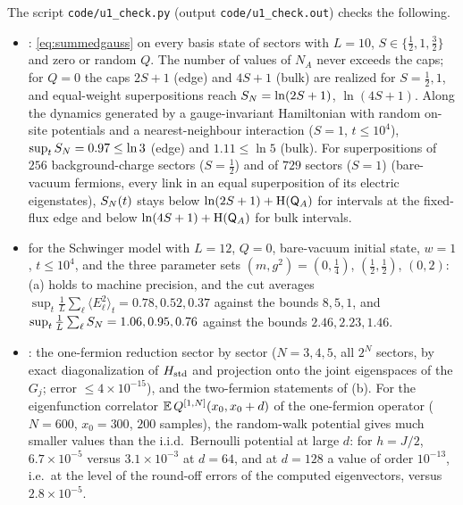 \begin{remark}\label{rem:u1numerics}
The script \texttt{code/u1\_check.py} (output \texttt{code/u1\_check.out}) checks the following.
\begin{itemize}
\item {}: \eqref{eq:summedgauss} on every basis state of sectors with $L=10$, $S\in\{\frac12,1,\frac32\}$
and zero or random $Q$.  The number of values of $N_A$ never exceeds the caps; for $Q=0$ the caps $2S+1$ (edge) and
$4S+1$ (bulk) are realized for $S=\frac12,1$, and equal-weight superpositions reach $S_{N}=\ln(2S+1)$, $\ln(4S+1)$.  Along
the dynamics generated by a gauge-invariant Hamiltonian with random on-site potentials and a nearest-neighbour
interaction ($S=1$, $t\le10^4$), $\sup_tS_{N}=0.97\le\ln3$ (edge) and $1.11\le\ln5$ (bulk).  For superpositions of
$256$ background-charge sectors ($S=\frac12$) and of $729$ sectors ($S=1$) (bare-vacuum fermions, every link in an equal
superposition of its electric eigenstates), $S_{N}(t)$ stays below $\ln(2S+1)+\mathrm{H}(\mathsf{Q}_A)$ for intervals at the
fixed-flux edge and below $\ln(4S+1)+\mathrm{H}(\mathsf{Q}_A)$ for bulk intervals.
\item {} for the Schwinger model with $L=12$, $Q=0$, bare-vacuum initial state, $w=1$,
$t\le10^4$, and the three parameter sets $(m,g^2)=(0,\frac14)$, $(\frac12,\frac12)$, $(0,2)$: (a) holds to machine
precision, and the cut averages
$\sup_t\frac1L\sum_\ell\langle E_\ell^2\rangle_t=0.78,0.52,0.37$ against the bounds $8,5,1$, and
$\sup_t\frac1L\sum_\ell S_{N}=1.06,0.95,0.76$ against the bounds $2.46,2.23,1.46$.
\item {}: the one-fermion reduction sector by sector ($N=3,4,5$, all $2^N$ sectors, by exact
diagonalization of $H_{\rm std}$ and projection onto the joint eigenspaces of the $G_j$; error $\le4\times10^{-15}$), and
the two-fermion statements of (b).  For the eigenfunction correlator $\mathbb{E}\,Q^{[1,N]}(x_0,x_0+d)$ of the one-fermion operator ($N=600$, $x_0=300$,
$200$ samples), the
random-walk potential gives much smaller values than the i.i.d.\ Bernoulli potential at large $d$: for $h=J/2$,
$6.7\times10^{-5}$ versus $3.1\times10^{-3}$ at $d=64$, and at $d=128$ a value of order $10^{-13}$, i.e.\ at the
level of the round-off errors of the computed eigenvectors, versus $2.8\times10^{-5}$.
\end{itemize}
\end{remark}
